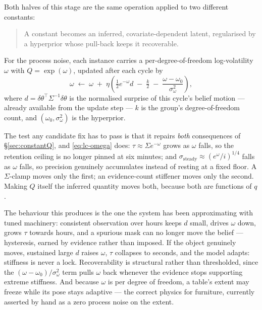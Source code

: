 \documentclass[11pt,a4paper]{report}
\begin{document}
Both halves of this stage are the same operation applied to two different constants:

\begin{quote}
A constant becomes an inferred, covariate-dependent latent, regularised by a hyperprior whose
pull-back keeps it recoverable.
\end{quote}

For the process noise, each instance carries a per-degree-of-freedom log-volatility $\omega$ with
$Q=\exp(\omega)$, updated after each cycle by
\begin{equation}
\omega \;\leftarrow\; \omega \;+\; \eta\left(\tfrac{1}{2}e^{-\omega}d \;-\; \tfrac{k}{2} \;-\; \frac{\omega-\omega_0}{\sigma_\omega^2}\right),
\label{eq:lc-omega}
\end{equation}
where $d=\delta\theta^{\!\top}\Sigma^{-1}\delta\theta$ is the normalised surprise of this cycle's
belief motion --- already available from the update step --- $k$ is the group's degree-of-freedom
count, and $(\omega_0,\sigma_\omega^2)$ is the hyperprior.

The test any candidate fix has to pass is that it repairs \emph{both} consequences of
\S\ref{sec:constantQ}, and \eqref{eq:lc-omega} does: $\tau\approx\Sigma e^{-\omega}$ grows as $\omega$
falls, so the retention ceiling is no longer pinned at six minutes; and
$\sigma_{\text{steady}}\approx(e^{\omega}/i)^{1/4}$ falls as $\omega$ falls, so precision genuinely
accumulates instead of resting at a fixed floor. A $\Sigma$-clamp moves only the first; an
evidence-count stiffener moves only the second. Making $Q$ itself the inferred quantity moves both,
because both are functions of $q$.

The behaviour this produces is the one the system has been approximating with tuned machinery:
consistent observation over hours keeps $d$ small, drives $\omega$ down, grows $\tau$ towards hours,
and a spurious mask can no longer move the belief --- hysteresis, earned by evidence rather than
imposed. If the object genuinely moves, sustained large $d$ raises $\omega$, $\tau$ collapses to
seconds, and the model adapts: stiffness is never a lock. Recoverability is structural rather than
thresholded, since the $(\omega-\omega_0)/\sigma_\omega^2$ term pulls $\omega$ back whenever the
evidence stops supporting extreme stiffness. And because $\omega$ is per degree of freedom, a table's
extent may freeze while its pose stays adaptive --- the correct physics for furniture, currently
asserted by hand as a zero process noise on the extent.
\end{document}
